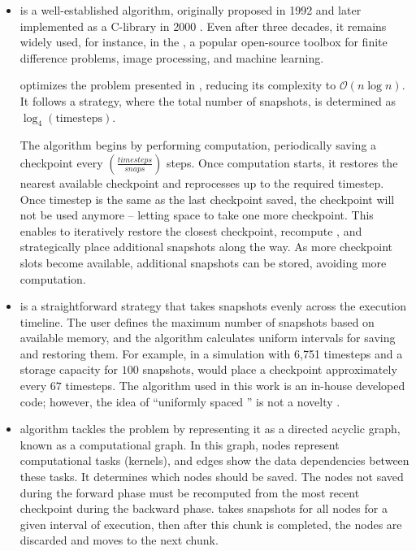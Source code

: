 \documentclass[Ingles]{ic-tese-v3}
\begin{document}
\begin{itemize}
    \item \textbf{\revolve} \cite{revolve} is a well-established \checkpointing algorithm, originally proposed in 1992 \cite{revolve1992} and later implemented as a C-library in 2000 \cite{revolve}. Even after three decades, it remains widely used, for instance, in the  \cite{devito-api, devito-compiler}, a popular open-source toolbox for finite difference problems, image processing, and machine learning. 
    
    \revolve optimizes the problem presented in , reducing its complexity to $\mathcal{O}(n \log n)$. It follows a  strategy, where the total number of snapshots, is determined as $\log_4 (\text{timesteps})$. 

    The algorithm begins by performing \fwd computation, periodically saving a checkpoint every $(\frac{timesteps} {snaps})$ steps. Once \bwd computation starts, it restores the nearest available checkpoint and reprocesses \fwd up to the required \bwd timestep. Once \bwd timestep is the same as the last checkpoint saved, the checkpoint will not be used anymore -- letting space to take one more checkpoint. This enables \revolve to iteratively restore the closest checkpoint, recompute \fwd, and strategically place additional snapshots along the way. As more checkpoint slots become available, additional snapshots can be stored, avoiding more computation.

    \item \textbf{\uniform} is a straightforward \checkpointing strategy that takes snapshots evenly across the execution timeline. The user defines the maximum number of snapshots based on available memory, and the algorithm calculates uniform intervals for saving and restoring them. For example, in a simulation with 6,751 timesteps and a storage capacity for $100$ snapshots, \uniform would place a checkpoint approximately every $67$ timesteps. The \uniform algorithm used in this work is an in-house developed code; however, the idea of ``uniformly spaced \checkpointing'' is not a novelty \cite{ahlroth2011}.

    \item \textbf{\zcut}\cite{zcut} algorithm tackles the problem by representing it as a directed acyclic graph, known as a computational graph. In this graph, nodes represent computational tasks (kernels), and edges show the data dependencies between these tasks. It determines which nodes should be saved. The nodes not saved during the forward phase must be recomputed from the most recent checkpoint during the backward phase. \zcut takes snapshots for all nodes for a given interval of execution, then after this chunk is completed, the nodes are discarded and moves to the next chunk.
\end{itemize}
\end{document}
